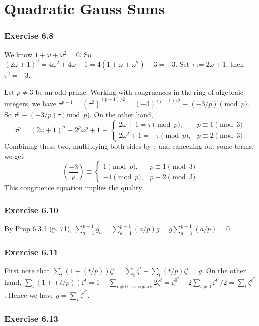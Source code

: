 \documentclass[../I&R.tex]{subfiles}
\begin{document}
\chapter{Quadratic Gauss Sums}

\subsection*{Exercise 6.8}

We know $1+\omega+\omega^2=0$. So $(2\omega+1)^2=4\omega^2+4\omega+1=4(1+\omega+\omega^2)-3=-3$. Set $\tau:=2\omega+1$, then $\tau^2=-3$.

Let $p\neq 3$ be an odd prime. Working with congruences in the ring of algebraic integers, we have $\tau^{p-1}=(\tau^2)^{(p-1)/2}=(-3)^{(p-1)/2}\equiv (-3/p) \pmod{p}$. So $\tau^p\equiv (-3/p)\tau \pmod{p}$. On the other hand,
$$\tau^p = (2\omega+1)^p \equiv 2^p\omega^p+1 \equiv
\begin{cases}
2\omega+1 = \tau \pmod{p}, & p\equiv 1\pmod{3} \\
2\omega^2+1 = -\tau \pmod{p}, & p\equiv 2\pmod{3}
\end{cases}$$
Combining these two, multiplying both sides by $\tau$ and cancelling out some terms, we get $$\left(\dfrac{-3}{p}\right) \equiv
\begin{cases}
1 \pmod{p}, & p\equiv 1\pmod{3} \\
-1 \pmod{p}, & p\equiv 2\pmod{3}
\end{cases}$$
This congruence equation implies the quality.

\subsection*{Exercise 6.10}

By Prop 6.3.1 (p. 71), $\sum_{a=1}^{p-1} g_a = \sum_{a=1}^{p-1} (a/p)g = g\sum_{a=1}^{p-1} (a/p)=0$.

\subsection*{Exercise 6.11}

First note that $\sum_t (1+(t/p))\zeta^t = \sum_t \zeta^t + \sum_t (t/p)\zeta^t =g$. On the other hand, $\sum_t (1+(t/p))\zeta^t =1 + \sum_{t\neq 0 \text{ is a square}} 2\zeta^t = \zeta^{0^2} + 2\sum_{t\neq 0}\zeta^{t^2}/2 = \sum_t \zeta^{t^2}$. Hence we have $g=\sum_t \zeta^{t^2}$.

\subsection*{Exercise 6.13}
\end{document}
